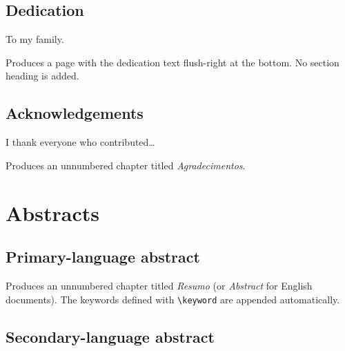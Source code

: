 \documentclass[11pt,a4paper]{article}
\newcommand{\cmd}[1]{\texttt{\textbackslash #1}}
\begin{document}
\subsection{Dedication}

\begin{latex}
\begin{dedicatoria}
  To my family.
\end{dedicatoria}
\end{latex}

Produces a page with the dedication text flush-right at the bottom.
No section heading is added.

\subsection{Acknowledgements}

\begin{latex}
\begin{agradecimentos}
  I thank everyone who contributed\ldots
\end{agradecimentos}
\end{latex}

Produces an unnumbered chapter titled \textit{Agradecimentos}.

\section{Abstracts}
\label{sec:abstracts}

\subsection{Primary-language abstract}

\begin{latex}
\begin{abstract}
  <Abstract text.>
\end{abstract}
\end{latex}

Produces an unnumbered chapter titled \textit{Resumo} (or
\textit{Abstract} for English documents).  The keywords defined with
\cmd{keyword} are appended automatically.

\subsection{Secondary-language abstract}
\end{document}
